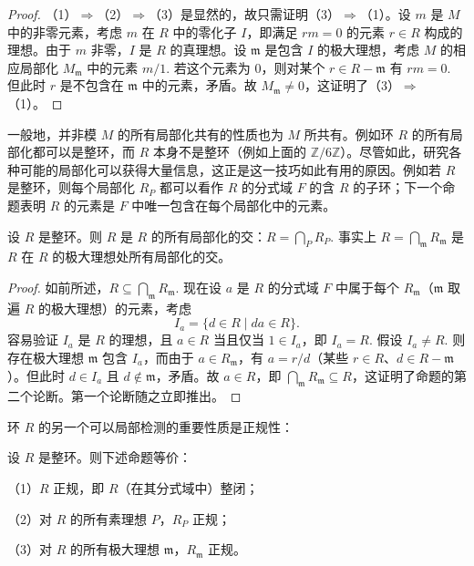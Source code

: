 \begin{proof}
（1）\(\Rightarrow\)（2）\(\Rightarrow\)（3）是显然的，故只需证明（3）\(\Rightarrow\)（1）。设 \(m\) 是 \(M\) 中的非零元素，考虑 \(m\) 在 \(R\) 中的零化子 \(I\)，即满足 \(rm = 0\) 的元素 \(r \in R\) 构成的理想。由于 \(m\) 非零，\(I\) 是 \(R\) 的真理想。设 \(\mathfrak{m}\) 是包含 \(I\) 的极大理想，考虑 \(M\) 的相应局部化 \(M_{\mathfrak{m}}\) 中的元素 \(m/1\). 若这个元素为 0，则对某个 \(r \in R-\mathfrak{m}\) 有 \(rm = 0\). 但此时 \(r\) 是不包含在 \(\mathfrak{m}\) 中的元素，矛盾。故 \(M_{\mathfrak{m}} \neq 0\)，这证明了（3）\(\Rightarrow\)（1）。
\end{proof}

一般地，并非模 \(M\) 的所有局部化共有的性质也为 \(M\) 所共有。例如环 \(R\) 的所有局部化都可以是整环，而 \(R\) 本身不是整环（例如上面的 \(\mathbb{Z}/6\mathbb{Z}\)）。尽管如此，研究各种可能的局部化可以获得大量信息，这正是这一技巧如此有用的原因。例如若 \(R\) 是整环，则每个局部化 \(R_P\) 都可以看作 \(R\) 的分式域 \(F\) 的含 \(R\) 的子环；下一个命题表明 \(R\) 的元素是 \(F\) 中唯一包含在每个局部化中的元素。

\begin{proposition}\label{pro:15.48}
设 \(R\) 是整环。则 \(R\) 是 \(R\) 的所有局部化的交：\(R = \bigcap_PR_P\). 事实上 \(R = \bigcap_{\mathfrak{m}}R_{\mathfrak{m}}\) 是 \(R\) 在 \(R\) 的极大理想处所有局部化的交。
\end{proposition}

\begin{proof}
如前所述，\(R \subseteq \bigcap_{\mathfrak{m}}R_{\mathfrak{m}}\). 现在设 \(a\) 是 \(R\) 的分式域 \(F\) 中属于每个 \(R_{\mathfrak{m}}\)（\(\mathfrak{m}\) 取遍 \(R\) 的极大理想）的元素，考虑
\[
I_a = \{d \in R \mid da \in R\}.
\]
容易验证 \(I_a\) 是 \(R\) 的理想，且 \(a \in R\) 当且仅当 \(1 \in I_a\)，即 \(I_a = R\). 假设 \(I_a \neq R\). 则存在极大理想 \(\mathfrak{m}\) 包含 \(I_a\)，而由于 \(a \in R_{\mathfrak{m}}\)，有 \(a = r/d\)（某些 \(r \in R\)、\(d \in R-\mathfrak{m}\)）。但此时 \(d \in I_a\) 且 \(d \notin \mathfrak{m}\)，矛盾。故 \(a \in R\)，即 \(\bigcap_{\mathfrak{m}}R_{\mathfrak{m}} \subseteq R\)，这证明了命题的第二个论断。第一个论断随之立即推出。
\end{proof}

环 \(R\) 的另一个可以局部检测的重要性质是正规性：

\begin{proposition}\label{pro:15.49}
设 \(R\) 是整环。则下述命题等价：

（1）\(R\) 正规，即 \(R\)（在其分式域中）整闭；

（2）对 \(R\) 的所有素理想 \(P\)，\(R_P\) 正规；

（3）对 \(R\) 的所有极大理想 \(\mathfrak{m}\)，\(R_{\mathfrak{m}}\) 正规。
\end{proposition}

